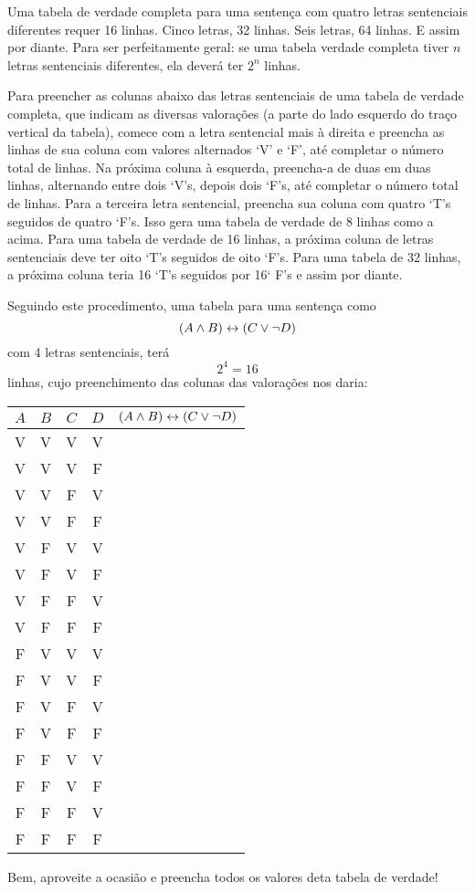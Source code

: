 Uma tabela de verdade completa para uma sentença com quatro letras sentenciais diferentes requer 16 linhas.
Cinco letras, 32 linhas.
Seis letras, 64 linhas.
E assim por diante.
Para ser perfeitamente geral: se uma tabela verdade completa tiver $n$ letras sentenciais diferentes, ela deverá ter $2^n$ linhas.

Para preencher as colunas abaixo das letras sentenciais de uma tabela de verdade completa, que indicam as diversas valorações (a parte do lado esquerdo do traço vertical da tabela), comece com a letra sentencial mais à direita e preencha as linhas de sua coluna com valores alternados `V' e `F', até completar o número total de linhas.
Na próxima coluna à esquerda, preencha-a de duas em duas linhas, alternando entre dois `V's, depois dois `F's, até completar o número total de linhas.
Para a terceira letra sentencial, preencha sua coluna com quatro `T's seguidos de quatro `F's. Isso gera uma tabela de verdade de 8 linhas como a acima.
Para uma tabela de verdade de 16 linhas, a próxima coluna de letras sentenciais deve ter oito `T's seguidos de oito `F's.
Para uma tabela de 32 linhas, a próxima coluna teria 16 `T's seguidos por 16` F's e assim por diante.

Seguindo este procedimento, uma tabela para uma sentença como
$$(A \wedge B) \leftrightarrow (C \vee \neg D)$$
com 4 letras sentenciais, terá
$$2^4=16$$
linhas, cujo preenchimento das colunas das valorações nos daria:
\begin{center}
\begin{tabular}{c c c c|c}
$A$&$B$&$C$&$D$&$(A \wedge B) \leftrightarrow (C \vee \neg D)$\\
\hline
V & V & V & V &  \\
V & V & V & F &  \\
V & V & F & V & \\
V & V & F & F & \\
V & F & V & V & \\
V & F & V & F & \\
V & F & F & V & \\
V & F & F & F & \\
F & V & V & V & \\
F & V & V & F & \\
F & V & F & V & \\
F & V & F & F & \\
F & F & V & V & \\
F & F & V & F & \\
F & F & F & V & \\
F & F & F & F & 
\end{tabular}
\end{center}
Bem, aproveite a ocasião e preencha todos os valores deta tabela de verdade!


